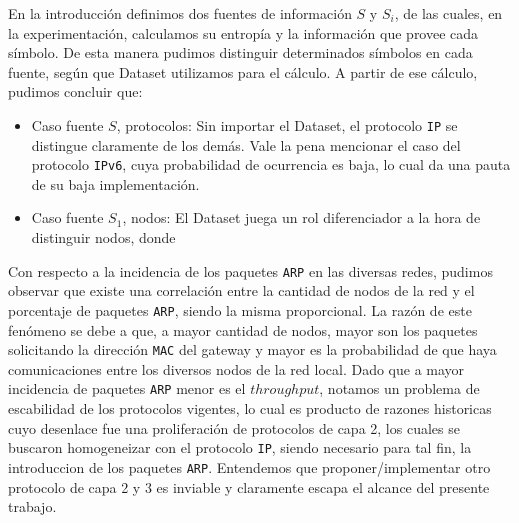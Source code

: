 En la introducción definimos dos fuentes de información $S$ y $S_{i}$, de las cuales, en la experimentación, calculamos su entropía y la información que provee cada símbolo. De esta manera pudimos distinguir determinados símbolos en cada fuente, según que Dataset utilizamos para el cálculo. A partir de ese cálculo, pudimos concluir que:
\begin{itemize}
  \item Caso fuente $S$, protocolos: Sin importar el Dataset, el protocolo \texttt{IP} se distingue claramente de los demás. Vale la pena mencionar el caso del protocolo \texttt{IPv6}, cuya probabilidad de ocurrencia es baja, lo cual da una pauta de su baja implementación.
  \item Caso fuente $S_{1}$, nodos: El Dataset juega un rol diferenciador a la hora de distinguir nodos, donde  
\end{itemize}

Con respecto a la incidencia de los paquetes \texttt{ARP} en las diversas redes, pudimos observar que existe una correlación entre la cantidad de nodos de la red y el porcentaje de paquetes \texttt{ARP}, siendo la misma proporcional. La razón de este fenómeno se debe a que, a mayor cantidad de nodos, mayor son los paquetes solicitando la dirección \texttt{MAC} del gateway y mayor es la probabilidad de que haya comunicaciones entre los diversos nodos de la red local. Dado que a mayor incidencia de paquetes \texttt{ARP} menor es el $throughput$, notamos un problema de escabilidad de los protocolos vigentes, lo cual es producto de razones historicas cuyo desenlace fue una proliferación de protocolos de capa 2, los cuales se buscaron homogeneizar con el protocolo \texttt{IP}, siendo necesario para tal fin, la introduccion de los paquetes \texttt{ARP}. Entendemos que proponer/implementar otro protocolo de capa 2 y 3 es inviable y claramente escapa el alcance del presente trabajo.
